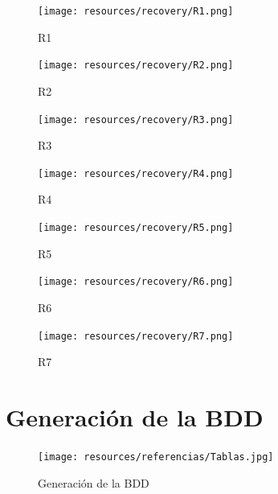 \begin{figure}[h]
    \centering
    \texttt{[image: resources/recovery/R1.png]}
    \caption{R1}
\end{figure}

\begin{figure}[h]
    \centering
    \texttt{[image: resources/recovery/R2.png]}
    \caption{R2}
\end{figure}

\begin{figure}[h]
    \centering
    \texttt{[image: resources/recovery/R3.png]}
    \caption{R3}
\end{figure}

\begin{figure}[h]
    \centering
    \texttt{[image: resources/recovery/R4.png]}
    \caption{R4}
\end{figure}

\begin{figure}[h]
    \centering
    \texttt{[image: resources/recovery/R5.png]}
    \caption{R5}
\end{figure}

\begin{figure}[h]
    \centering
    \texttt{[image: resources/recovery/R6.png]}
    \caption{R6}
\end{figure}

\begin{figure}[h]
    \centering
    \texttt{[image: resources/recovery/R7.png]}
    \caption{R7}
\end{figure}

\clearpage

\section{Generación de la BDD}
\begin{figure}[h]
    \centering
    \texttt{[image: resources/referencias/Tablas.jpg]}
    \caption{Generación de la BDD}
\end{figure}

